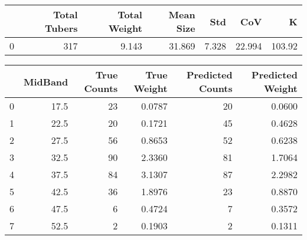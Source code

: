 \begin{tabular}{lrrrrrr}
\toprule
{} &  Total Tubers &  Total Weight &  Mean Size &    Std &     CoV &       K \\
\midrule
0 &           317 &         9.143 &     31.869 &  7.328 &  22.994 &  103.92 \\
\bottomrule
\end{tabular}

\begin{tabular}{lrrrrr}
\toprule
{} &  MidBand &  True Counts &  True Weight &  Predicted Counts &  Predicted Weight \\
\midrule
0 &     17.5 &           23 &       0.0787 &                20 &            0.0600 \\
1 &     22.5 &           20 &       0.1721 &                45 &            0.4628 \\
2 &     27.5 &           56 &       0.8653 &                52 &            0.6238 \\
3 &     32.5 &           90 &       2.3360 &                81 &            1.7064 \\
4 &     37.5 &           84 &       3.1307 &                87 &            2.2982 \\
5 &     42.5 &           36 &       1.8976 &                23 &            0.8870 \\
6 &     47.5 &            6 &       0.4724 &                 7 &            0.3572 \\
7 &     52.5 &            2 &       0.1903 &                 2 &            0.1311 \\
\bottomrule
\end{tabular}
